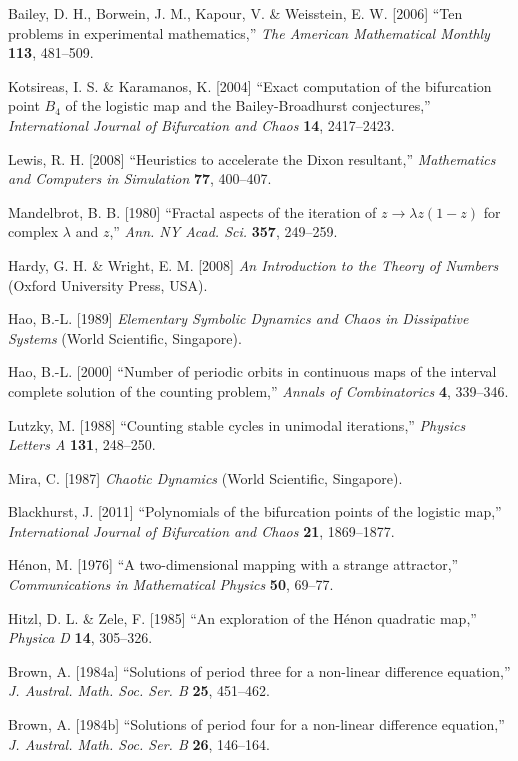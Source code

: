 \documentclass{ws-ijbc}
\begin{document}
\begin{thebibliography}{50}
  Bailey, D. H., Borwein, J. M., Kapour, V. \& Weisstein, E. W. [2006]
  ``Ten problems in experimental mathematics,''
  {\it The American Mathematical Monthly}
  \textbf{113},
  481--509.

  Kotsireas, I. S. \& Karamanos, K. [2004]
  ``Exact computation of the bifurcation point $B_4$ of the logistic map
  and  the Bailey-Broadhurst conjectures,''
  {\it International Journal of Bifurcation and Chaos}
  \textbf{14},
  2417--2423.

  Lewis, R. H. [2008]
  ``Heuristics to accelerate the Dixon resultant,''
  {\it Mathematics and Computers in Simulation}
  \textbf{77},
  400--407.

  Mandelbrot, B. B. [1980]
  ``Fractal aspects of the iteration of $z \rightarrow \lambda z(1-z)$
      for complex $\lambda$ and $z$,''
  {\it Ann. NY Acad. Sci.}
  \textbf{357},
  249--259.

  Hardy, G. H. \& Wright, E. M. [2008]
  {\it An Introduction to the Theory of Numbers}
  (Oxford University Press, USA).

  Hao, B.-L. [1989]
  {\it Elementary Symbolic Dynamics and Chaos in  Dissipative Systems}
  (World Scientific, Singapore).

  Hao, B.-L. [2000]
  ``Number of periodic orbits in continuous maps of
  the interval complete solution of the counting problem,''
  {\it Annals of Combinatorics}
  \textbf{4},
  339--346.

  Lutzky, M. [1988]
  ``Counting stable cycles in unimodal iterations,''
  {\it Physics Letters A}
  \textbf{131},
  248--250.

  Mira, C. [1987]
  {\it Chaotic Dynamics}
  (World Scientific, Singapore).

  Blackhurst, J. [2011]
  ``Polynomials of the bifurcation points of the logistic map,''
  {\it International Journal of Bifurcation and Chaos}
  \textbf{21},
  1869--1877.

  H\'enon, M. [1976]
  ``A two-dimensional mapping with a strange attractor,''
  {\it Communications in Mathematical Physics}
  \textbf{50},
  69--77.

  Hitzl, D. L. \& Zele, F. [1985]
  ``An exploration of the H\'enon quadratic map,''
  {\it Physica D}
  \textbf{14},
  305--326.

  Brown, A. [1984a]
  ``Solutions of period three for a non-linear difference equation,''
  {\it J. Austral. Math. Soc. Ser. B}
  \textbf{25},
  451--462.

  Brown, A. [1984b]
  ``Solutions of period four for a non-linear difference equation,''
  {\it J. Austral. Math. Soc. Ser. B}
  \textbf{26},
  146--164.


\end{thebibliography}
\end{document}
